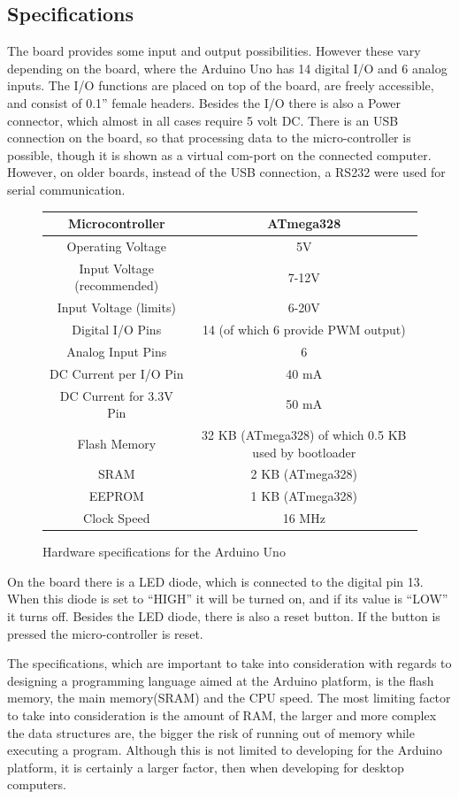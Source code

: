 \subsection*{Specifications}
The board provides some input and output possibilities. However these vary depending on the board, where the Arduino Uno has 14 digital I/O and 6 analog inputs. The I/O functions are placed on top of the board, are freely accessible, and consist of 0.1'' female headers. Besides the I/O there is also a Power connector, which almost in all cases require 5 volt DC. There is an USB connection on the board, so that processing data to the micro-controller is possible, though it is shown as a virtual com-port on the connected computer. However, on older boards, instead of the USB connection, a RS232 were used for serial communication. 

\begin{figure}[H]
\centering
\begin{tabular}{|c|c|}
\hline 
Microcontroller & ATmega328 \\ 
\hline 
Operating Voltage & 5V \\ 
\hline 
Input Voltage (recommended)	 & 7-12V \\ 
\hline 
Input Voltage (limits) & 6-20V \\ 
\hline 
Digital I/O Pins & 14 (of which 6 provide PWM output) \\ 
\hline 
Analog Input Pins & 6 \\ 
\hline 
DC Current per I/O Pin & 40 mA \\ 
\hline 
DC Current for 3.3V Pin & 50 mA \\ 
\hline 
Flash Memory & 32 KB (ATmega328) of which 0.5 KB used by bootloader \\ 
\hline 
SRAM & 2 KB (ATmega328) \\ 
\hline 
EEPROM & 1 KB (ATmega328) \\ 
\hline 
Clock Speed & 16 MHz \\ 
\hline 
\end{tabular} 
\caption{Hardware specifications for the Arduino Uno}
\end{figure}

On the board there is a LED diode, which is connected to the digital pin 13. When this diode is set to ``HIGH'' it will be turned on, and if its value is ``LOW'' it turns off. Besides the LED diode, there is also a reset button. If the button is pressed the micro-controller is reset. 

The specifications, which are important to take into consideration with regards to designing a programming language aimed at the Arduino platform, is the flash memory, the main memory(SRAM) and the CPU speed. The most limiting factor to take into consideration is the amount of RAM, the larger and more complex the data structures are, the bigger the risk of running out of memory while executing a program. Although this is not limited to developing for the Arduino platform, it is certainly a larger factor, then when developing for desktop computers.

